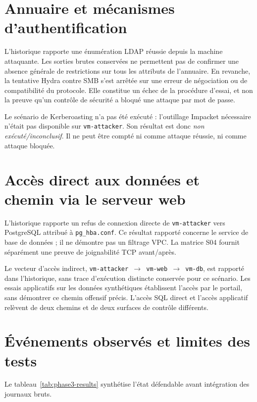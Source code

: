 \documentclass[a4paper,12pt]{report}
\begin{document}
\section{Annuaire et mécanismes d'authentification}
L'historique rapporte une énumération LDAP réussie depuis la machine attaquante. Les sorties brutes conservées ne permettent pas de confirmer une absence générale de restrictions sur tous les attributs de l'annuaire. En revanche, la tentative Hydra contre SMB s'est arrêtée sur une erreur de négociation ou de compatibilité du protocole. Elle constitue un échec de la procédure d'essai, et non la preuve qu'un contrôle de sécurité a bloqué une attaque par mot de passe.

Le scénario de Kerberoasting n'a pas été exécuté : l'outillage Impacket nécessaire n'était pas disponible sur \texttt{vm-attacker}. Son résultat est donc \emph{non exécuté/inconclusif}. Il ne peut être compté ni comme attaque réussie, ni comme attaque bloquée.
\section{Accès direct aux données et chemin via le serveur web}
L'historique rapporte un refus de connexion directe de \texttt{vm-attacker} vers PostgreSQL attribué à \texttt{pg\_hba.conf}. Ce résultat rapporté concerne le service de base de données ; il ne démontre pas un filtrage VPC. La matrice S04 fournit séparément une preuve de joignabilité TCP avant/après.

Le vecteur d'accès indirect, \texttt{vm-attacker $\rightarrow$ vm-web $\rightarrow$ vm-db}, est rapporté dans l'historique, sans trace d'exécution distincte conservée pour ce scénario. Les essais applicatifs sur les données synthétiques établissent l'accès par le portail, sans démontrer ce chemin offensif précis. L'accès SQL direct et l'accès applicatif relèvent de deux chemins et de deux surfaces de contrôle différents.
\section{Événements observés et limites des tests}
Le tableau~\ref{tab:phase3-results} synthétise l'état défendable avant intégration des journaux bruts.
\end{document}
